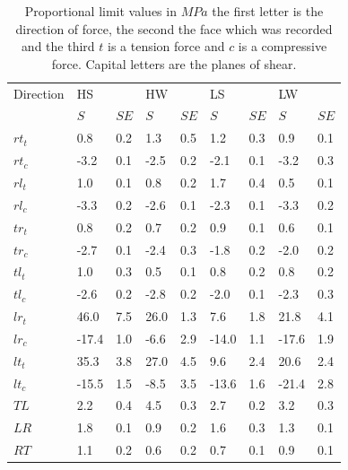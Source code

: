 \documentclass[10pt]{article}
\begin{document}
\begin{table}
\caption[Proportional limits]{Proportional limit values in \(MPa\) the first letter is the direction of force, the second the face which was recorded and the third \(t\) is a tension force and \(c\) is a compressive force. Capital letters are the planes of shear.}
\label{table:yield points}
\begin{tabular}{lllllllll}
\hline
Direction & HS && HW && LS && LW & \\
 & \(S\)&\(SE\)& \(S\)&\(SE\)& \(S\)&\(SE\)& \(S\)&\(SE\)\\
\hline
\(rt_t\) & 0.8 & 0.2& 1.3& 0.5& 1.2 & 0.3& 0.9 & 0.1 \\
\(rt_c\) & -3.2 & 0.1& -2.5& 0.2& -2.1 & 0.1& -3.2 & 0.3 \\
\(rl_t\) & 1.0 & 0.1& 0.8& 0.2& 1.7 & 0.4& 0.5 & 0.1 \\
\(rl_c\) & -3.3 & 0.2& -2.6& 0.1&-2.3 & 0.1& -3.3 & 0.2 \\
\(tr_t\) & 0.8 & 0.2& 0.7& 0.2& 0.9 & 0.1& 0.6 & 0.1 \\
\(tr_c\) & -2.7 & 0.1& -2.4& 0.3& -1.8 & 0.2& -2.0 & 0.2 \\
\(tl_t\) & 1.0 & 0.3& 0.5& 0.1& 0.8 & 0.2& 0.8 & 0.2 \\
\(tl_c\) & -2.6 & 0.2& -2.8& 0.2& -2.0 & 0.1& -2.3 & 0.3 \\
\(lr_t\) & 46.0 & 7.5& 26.0& 1.3& 7.6 & 1.8& 21.8 & 4.1 \\
\(lr_c\) & -17.4 & 1.0& -6.6& 2.9& -14.0 & 1.1& -17.6 & 1.9 \\
\(lt_t\) & 35.3 & 3.8& 27.0& 4.5& 9.6 & 2.4& 20.6 & 2.4 \\
\(lt_c\) & -15.5 & 1.5& -8.5& 3.5& -13.6 & 1.6& -21.4 & 2.8 \\
\(TL\) & 2.2 & 0.4& 4.5& 0.3& 2.7 & 0.2&3.2 & 0.3 \\
\(LR\) & 1.8 & 0.1& 0.9& 0.2& 1.6 & 0.3& 1.3 & 0.1 \\
\(RT\) & 1.1 & 0.2& 0.6& 0.2& 0.7 & 0.1& 0.9 & 0.1 \\
\hline
\end{tabular}
\end{table}
\end{document}
